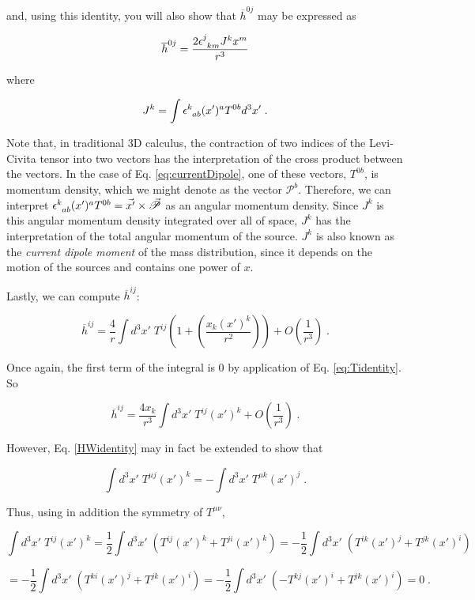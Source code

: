 \documentclass[10pt]{article}
\begin{document}
\noindent and, using this identity, you will also show that $\overline{h}^{0j}$ may be expressed as

\begin{align}\label{eq:h0j}
\overline{h}^{0j} = \frac{2\tensor{\epsilon}{^j_k_m} J^k x^m}{r^3}
\end{align}

\noindent where

\begin{align}\label{eq:currentDipole}
J^k = \int \tensor{\epsilon}{^k_a_b} (x')^a T^{0b} d^3 x' \; .
\end{align}

Note that, in traditional 3D calculus, the contraction of two indices of the Levi-Civita tensor into two vectors has the interpretation of the cross product between the vectors. In the case of Eq. \ref{eq:currentDipole}, one of these vectors, $T^{0b}$, is momentum density, which we might denote as the vector $\mathscr{P}^b$. Therefore, we can interpret $\tensor{\epsilon}{^k_a_b} (x')^a T^{0b} = \vec{x'} \times \vec{\mathscr{P}}$ as an angular momentum density. Since $J^k$ is this angular momentum density integrated over all of space, $J^k$ has the interpretation of the total angular momentum of the source. $J^k$ is also known as the \textit{current dipole moment} of the mass distribution, since it depends on the motion of the sources and contains one power of $x$.

Lastly, we can compute $\overline{h}^{ij}$:

\[ \overline{h}^{ij} = \frac{4}{r} \int d^3x' \; T^{ij} \left( 1 + \left( \frac{x_k(x')^k}{r^2} \right) \right) + O\left(\frac{1}{r^3}\right) \; . \]

Once again, the first term of the integral is 0 by application of Eq. \ref{eq:Tidentity}. So

\[ \overline{h}^{ij} = \frac{4x_k}{r^3} \int d^3x' \; T^{ij} (x')^k + O\left(\frac{1}{r^3}\right) \; . \]

However, Eq. \ref{HWidentity} may in fact be extended to show that 

\[ \int d^3x' \; T^{\mu j} (x')^k = - \int d^3x' \; T^{\mu k} (x')^j \; . \]

Thus, using in addition the symmetry of $T^{\mu\nu}$,

\[ \int d^3x' \; T^{ij} (x')^k =  \frac{1}{2} \int d^3x' \; \left( T^{ij}(x')^k + T^{ji} (x')^k \right) = -\frac{1}{2} \int d^3x' \; \left( T^{ik}(x')^j + T^{jk} (x')^i \right)\]

\[ = - \frac{1}{2} \int d^3x' \; \left( T^{ki}(x')^j + T^{jk} (x')^i \right) = - \frac{1}{2} \int d^3x' \; \left( - T^{kj}(x')^i + T^{jk} (x')^i \right) = 0 \; .\]
\end{document}
